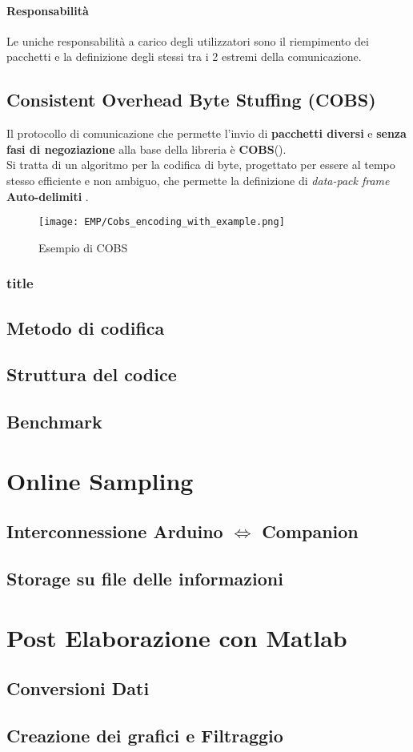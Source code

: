 \paragraph{Responsabilità} Le uniche responsabilità a carico degli utilizzatori sono il riempimento dei pacchetti e la definizione degli stessi tra i 2 estremi della comunicazione.

\subsection*{Consistent Overhead Byte Stuffing (COBS)}
Il protocollo di comunicazione che permette l’invio di \textbf{pacchetti diversi} e \textbf{senza fasi di negoziazione} alla base della libreria è \textbf{COBS}(\cite{COBS}).\\
Si tratta di un algoritmo per la codifica di byte, progettato per essere al tempo stesso efficiente e non ambiguo, che permette la definizione di \textit{data-pack frame} \textbf{Auto-delimiti} .

\begin{figure}[h]
	\centering
	\texttt{[image: EMP/Cobs\_encoding\_with\_example.png]}
	\caption[Esempio di COBS]{Esempio di COBS}
\end{figure}

\subsubsection{title}


\subsection{Metodo di codifica}
\subsection{Struttura del codice}
\subsection{Benchmark}

\section{Online Sampling}
\subsection{Interconnessione Arduino $\Leftrightarrow$ Companion}
\subsection{Storage su file delle informazioni}


\section{Post Elaborazione con Matlab}
\subsection{Conversioni Dati}
\subsection{Creazione dei grafici e Filtraggio}
